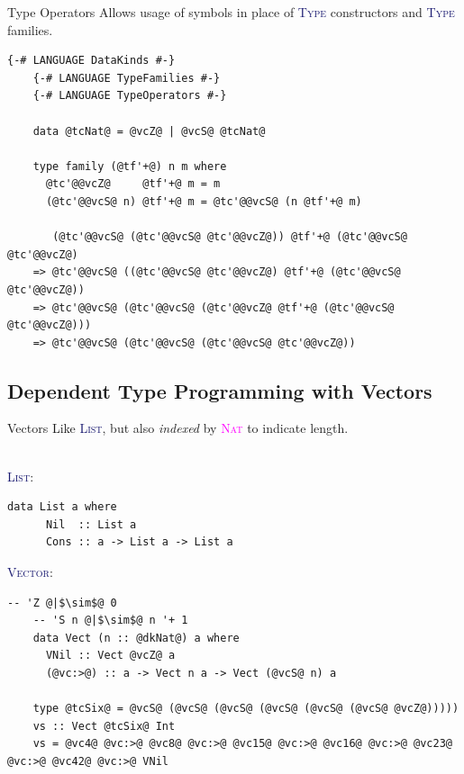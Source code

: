\documentclass[xcolor={usenames,dvipsnames}]{beamer}
\newcommand{\htycon}[1]{\textcolor{MidnightBlue}{\textsc{#1}}}
\newcommand{\hkind}[1]{\textcolor{Fuchsia}{\textsc{#1}}}
\begin{document}
\begin{frame}[fragile]{Type Operators}
  Allows usage of symbols in place of \htycon{Type} constructors and \htycon{Type} families.

  \begin{lstlisting}[style=hask]
    {-# LANGUAGE DataKinds #-}
    {-# LANGUAGE TypeFamilies #-}
    {-# LANGUAGE TypeOperators #-}

    data @tcNat@ = @vcZ@ | @vcS@ @tcNat@

    type family (@tf'+@) n m where
      @tc'@@vcZ@     @tf'+@ m = m
      (@tc'@@vcS@ n) @tf'+@ m = @tc'@@vcS@ (n @tf'+@ m)

       (@tc'@@vcS@ (@tc'@@vcS@ @tc'@@vcZ@)) @tf'+@ (@tc'@@vcS@ @tc'@@vcZ@)
    => @tc'@@vcS@ ((@tc'@@vcS@ @tc'@@vcZ@) @tf'+@ (@tc'@@vcS@ @tc'@@vcZ@))
    => @tc'@@vcS@ (@tc'@@vcS@ (@tc'@@vcZ@ @tf'+@ (@tc'@@vcS@ @tc'@@vcZ@)))
    => @tc'@@vcS@ (@tc'@@vcS@ (@tc'@@vcS@ @tc'@@vcZ@))
  \end{lstlisting}
\end{frame}


\subsection{Dependent Type Programming with Vectors}

\begin{frame}[fragile]{Vectors}
  Like \htycon{List}, but also \textit{indexed} by \hkind{Nat} to indicate length.

  \ \\
  \htycon{List}:
  \begin{lstlisting}[style=hask]
    data List a where
      Nil  :: List a
      Cons :: a -> List a -> List a
  \end{lstlisting}

  \htycon{Vector}:
  \begin{lstlisting}[style=hask]
    -- 'Z @|$\sim$@ 0
    -- 'S n @|$\sim$@ n '+ 1
    data Vect (n :: @dkNat@) a where
      VNil :: Vect @vcZ@ a
      (@vc:>@) :: a -> Vect n a -> Vect (@vcS@ n) a

    type @tcSix@ = @vcS@ (@vcS@ (@vcS@ (@vcS@ (@vcS@ (@vcS@ @vcZ@)))))
    vs :: Vect @tcSix@ Int
    vs = @vc4@ @vc:>@ @vc8@ @vc:>@ @vc15@ @vc:>@ @vc16@ @vc:>@ @vc23@ @vc:>@ @vc42@ @vc:>@ VNil
  \end{lstlisting}
\end{frame}
\end{document}
